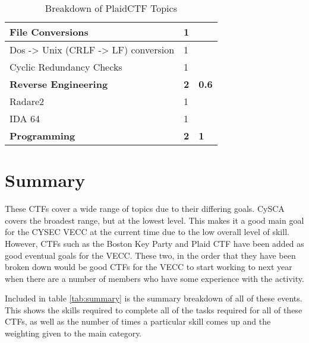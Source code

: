 \documentclass[a4paper,11pt]{report}
\begin{document}
\begin{table}[htb]
\begin{tabular}{| l | l | l |}
				\quad File Conversions & 1 & \\ \hline 
				\quad Dos -> Unix (CRLF -> LF) conversion & 1 & \\ \hline 
				\quad Cyclic Redundancy Checks & 1 & \\ \hline
				\textbf{Reverse Engineering} & \textbf{2} & \textbf{0.6} \\ \hline
				\quad Radare2 & 1 & \\ \hline
				\quad IDA 64 & 1 & \\ \hline 
				\textbf{Programming} & \textbf{2} & \textbf{1} \\ \hline
			\end{tabular}
			\caption{Breakdown of PlaidCTF Topics}
			\label{tab:PlaidCTF Breakdown}
		\end{table}

\chapter{Summary}
	These CTFs cover a wide range of topics due to their differing goals. 
	CySCA covers the broadest range, but at the lowest level. 
	This makes it a good main goal for the CYSEC VECC at the current time due to the low overall level of skill. 
	However, CTFs such as the Boston Key Party and Plaid CTF have been added as good eventual goals for the VECC. 
	These two, in the order that they have been broken down would be good CTFs for the VECC to start working to next year when there are a number of members who have some experience with the activity. 

	Included in table \ref{tab:summary} is the summary breakdown of all of these events. 
	This shows the skills required to complete all of the tasks required for all of these CTFs, as well as the number of times a particular skill comes up and the weighting given to the main category. 
\end{document}
